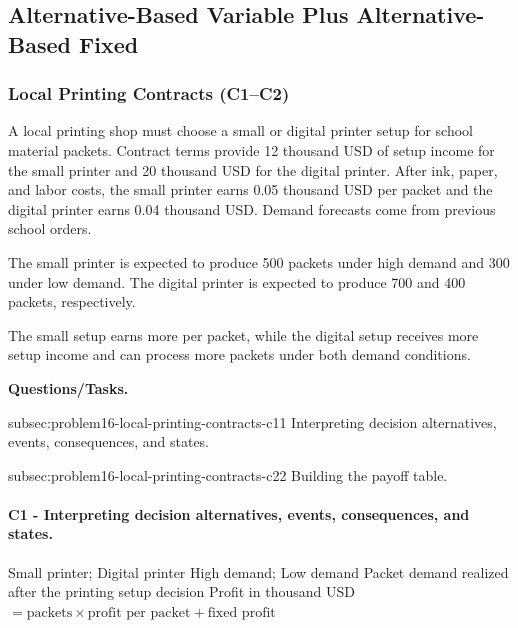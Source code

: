 	
	\subsection{Alternative-Based Variable Plus Alternative-Based Fixed}
	\label{sec:alternative-based-variable-payoff-plus-alternative-based-fixed-payoff}


	\subsubsection{Local Printing Contracts (C1--C2)}
	\label{sec:problem16-local-printing-contracts-c1-c2}
	
	A local printing shop must choose a small or digital printer setup for school material packets. Contract terms provide 12 thousand USD of setup income for the small printer and 20 thousand USD for the digital printer. After ink, paper, and labor costs, the small printer earns 0.05 thousand USD per packet and the digital printer earns 0.04 thousand USD. Demand forecasts come from previous school orders.
	
	The small printer is expected to produce 500 packets under high demand and 300 under low demand. The digital printer is expected to produce 700 and 400 packets, respectively.
	
	The small setup earns more per packet, while the digital setup receives more setup income and can process more packets under both demand conditions.

	\textbf{Questions/Tasks.}
	\begin{enumerate}
		\CriterionTask
		{subsec:problem16-local-printing-contracts-c1}{1}
		{Interpreting decision alternatives, events, consequences, and states.}

		\CriterionTask
		{subsec:problem16-local-printing-contracts-c2}{2}
		{Building the payoff table.}
	\end{enumerate}

\paragraph*{C1 - Interpreting decision alternatives, events, consequences, and states.}
	\label{subsec:problem16-local-printing-contracts-c1}
	\DecisionElementsTable
	{Small printer; Digital printer}
	{High demand; Low demand}
	{Packet demand realized after the printing setup decision}
	{Profit in thousand USD $= \text{packets} \times \text{profit per packet} + \text{fixed profit}$}


